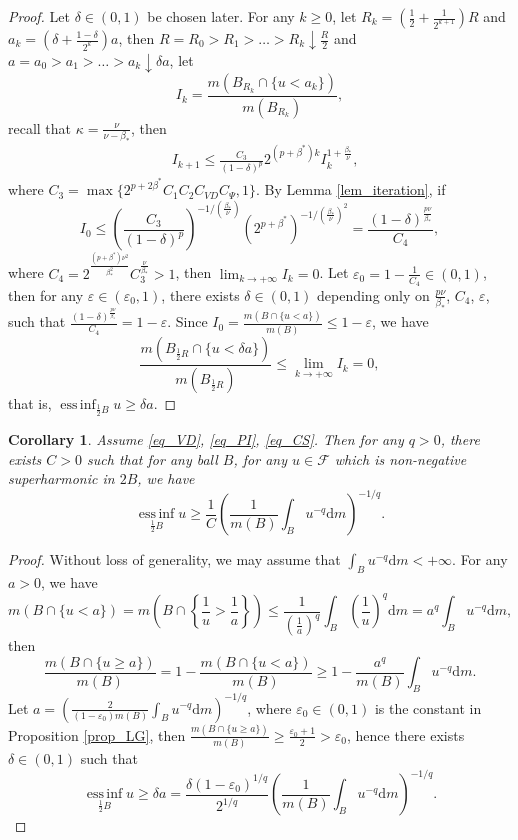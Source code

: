 \documentclass[11pt,a4paper]{article}
\numberwithin{equation}{section}
\newcommand{\einf}{\operatorname*{ess\,inf}}
\theoremstyle{plain}
\newtheorem{corollary}[theorem]{Corollary}
\theoremstyle{definition}
\begin{document}
\begin{proof}
Let $\delta\in(0,1)$ be chosen later. For any $k\ge0$, let $R_k=\left(\frac{1}{2}+\frac{1}{2^{k+1}}\right)R$ and $a_k=(\delta+\frac{1-\delta}{2^k})a$, then $R=R_0>R_1>\ldots>R_k\downarrow \frac{R}{2}$ and $a=a_0>a_1>\ldots>a_k\downarrow\delta a$, let
$$I_k=\frac{m(B_{R_k}\cap\{u<a_k\})}{m(B_{R_k})},$$
recall that $\kappa=\frac{\nu}{\nu-\beta_*}$, then
\begin{align*}
&I_{k+1}\le \frac{C_3}{(1-\delta)^p}2^{(p+\beta^*)k}I_{k}^{1+\frac{\beta_*}{\nu}},
\end{align*}
where $C_3=\max\{2^{p+2\beta^*}C_1C_2C_{VD}C_\Psi,1\}$. By Lemma \ref{lem_iteration}, if
$$I_0\le \left(\frac{C_3}{(1-\delta)^p}\right)^{-1/(\frac{\beta_*}{\nu})}\left(2^{p+\beta^*}\right)^{-1/(\frac{\beta_*}{\nu})^2}=\frac{(1-\delta)^{\frac{p\nu}{\beta_*}}}{C_4},$$
where $C_4=2^{\frac{(p+\beta^*)\nu^2}{\beta_*^2}}C_3^{\frac{\nu}{\beta_*}}>1$, then
$\lim_{k\to+\infty}I_k=0$. Let $\varepsilon_0=1-\frac{1}{C_4}\in(0,1)$, then for any $\varepsilon\in(\varepsilon_0,1)$, there exists $\delta\in(0,1)$ depending only on $\frac{p\nu}{\beta_*}$, $C_4$, $\varepsilon$, such that $\frac{(1-\delta)^{\frac{p\nu}{\beta_*}}}{C_4}=1-\varepsilon$. Since $I_0=\frac{m(B\cap\{u<a\})}{m(B)}\le 1-\varepsilon$, we have
$$\frac{m (B_{\frac{1}{2}R}\cap \{u<\delta a\})}{m (B_{\frac{1}{2}R})}\le\lim_{k\to+\infty}I_k=0,$$
that is, $\einf_{\frac{1}{2}B}u\ge\delta a$. 
\end{proof}

\begin{corollary}\label{cor_infu}
Assume \ref{eq_VD}, \ref{eq_PI}, \ref{eq_CS}. Then for any $q>0$, there exists $C>0$ such that for any ball $B$, for any $u\in\mathcal{F}$ which is non-negative superharmonic in $2B$, we have
$$\einf_{\frac{1}{2}B}u\ge \frac{1}{C}\left(\frac{1}{m(B)}\int_Bu^{-q}\mathrm{d} m\right)^{-1/q}.$$
\end{corollary}

\begin{proof}
Without loss of generality, we may assume that $\int_Bu^{-q}\mathrm{d} m<+\infty$. For any $a>0$, we have
$$m(B\cap\{u<a\})=m(B\cap\left\{\frac{1}{u}>\frac{1}{a}\right\})\le \frac{1}{\left(\frac{1}{a}\right)^q}\int_{B}\left(\frac{1}{u}\right)^q\mathrm{d} m=a^q\int_B u^{-q}\mathrm{d} m,$$
then
$$\frac{m(B\cap\{u\ge a\})}{m(B)}=1-\frac{m(B\cap\{u<a\})}{m(B)}\ge 1-\frac{a^q}{m(B)}\int_B u^{-q}\mathrm{d} m.$$
Let $a=\left(\frac{2}{(1-\varepsilon_0)m(B)}\int_Bu^{-q}\mathrm{d} m\right)^{-1/q}$, where $\varepsilon_0\in(0,1)$ is the constant in Proposition \ref{prop_LG}, then $\frac{m(B\cap\{u\ge a\})}{m(B)}\ge \frac{\varepsilon_0+1}{2}>\varepsilon_0$, hence there exists $\delta\in(0,1)$ such that
$$\einf_{\frac{1}{2}B}u\ge\delta a=\frac{\delta(1-\varepsilon_0)^{1/q}}{2^{1/q}}\left(\frac{1}{m(B)}\int_Bu^{-q}\mathrm{d} m\right)^{-1/q}.$$
\end{proof}
\end{document}
